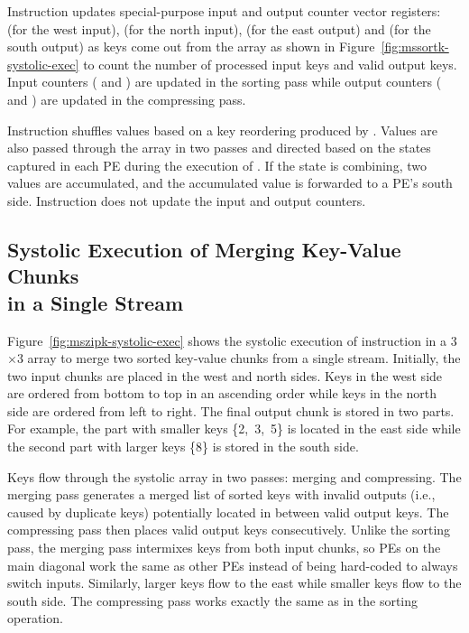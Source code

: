 Instruction  updates special-purpose input and output counter
vector registers:  (for the west input),  (for the north
input),  (for the east output) and  (for the south output)
as keys come out from the array as shown in
Figure~\ref{fig:mssortk-systolic-exec} to count the number of processed input
keys and valid output keys.
Input counters ( and ) are updated in the sorting pass
while output counters ( and ) are updated in the
compressing pass.

Instruction  shuffles values based on a key reordering produced by
.
Values are also passed through the array in two passes and directed based on
the states captured in each PE during the execution of .
If the state is combining, two values are accumulated, and the accumulated
value is forwarded to a PE's south side.
Instruction  does not update the input and output counters.

\subsection{Systolic Execution of Merging Key-Value Chunks \\ in a Single Stream}
\label{sec-spz-uarch-mszip}

Figure~\ref{fig:mszipk-systolic-exec} shows the systolic execution of
 instruction in a 3$\times$3 array to merge two sorted key-value
chunks from a single stream.
Initially, the two input chunks are placed in the west and north sides.
Keys in the west side are ordered from bottom to top in an ascending order
while keys in the north side are ordered from left to right.
The final output chunk is stored in two parts.
For example, the part with smaller keys \{2,~3,~5\} is located in the east side
while the second part with larger keys \{8\} is stored in the south side.

Keys flow through the systolic array in two passes: merging and compressing.
The merging pass generates a merged list of sorted keys with invalid outputs
(i.e., caused by duplicate keys) potentially located in between valid output
keys.
The compressing pass then places valid output keys consecutively.
Unlike the sorting pass, the merging pass intermixes keys from both input
chunks, so PEs on the main diagonal work the same as other PEs instead of being
hard-coded to always switch inputs.
Similarly, larger keys flow to the east while smaller keys flow to the south
side.
The compressing pass works exactly the same as in the sorting operation.

